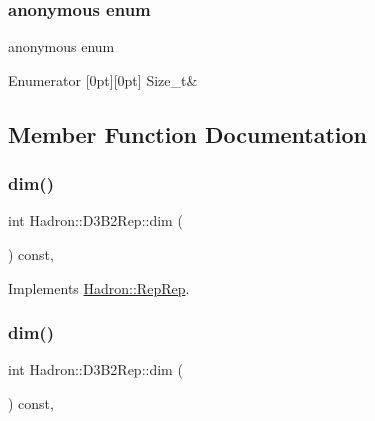 \subsubsection{\texorpdfstring{anonymous enum}{anonymous enum}}
{\footnotesize\ttfamily anonymous enum}

\begin{DoxyEnumFields}{Enumerator}
[0pt][0pt]{}\mbox{\label{structHadron_1_1D3B2Rep_aee5ca0a68155d3f0dab333db870c78abacdb28279ffcc9850d9a8bdc8fa24cd53}} 
Size\+\_\+t&\\
\hline

\end{DoxyEnumFields}


\subsection{Member Function Documentation}
\mbox{\label{structHadron_1_1D3B2Rep_a5b1737e056dda55a033851622de1412c}} 
\subsubsection{\texorpdfstring{dim()}{dim()}\hspace{0.1cm}{\footnotesize\ttfamily [1/5]}}
{\footnotesize\ttfamily int Hadron\+::\+D3\+B2\+Rep\+::dim (\begin{DoxyParamCaption}{ }\end{DoxyParamCaption}) const\hspace{0.3cm}{\ttfamily [inline]}, {\ttfamily [virtual]}}



Implements \mbox{\hyperlink{structHadron_1_1RepRep_a92c8802e5ed7afd7da43ccfd5b7cd92b}{Hadron\+::\+Rep\+Rep}}.

\mbox{\label{structHadron_1_1D3B2Rep_a5b1737e056dda55a033851622de1412c}} 
\subsubsection{\texorpdfstring{dim()}{dim()}\hspace{0.1cm}{\footnotesize\ttfamily [2/5]}}
{\footnotesize\ttfamily int Hadron\+::\+D3\+B2\+Rep\+::dim (\begin{DoxyParamCaption}{ }\end{DoxyParamCaption}) const\hspace{0.3cm}{\ttfamily [inline]}, {\ttfamily [virtual]}}



